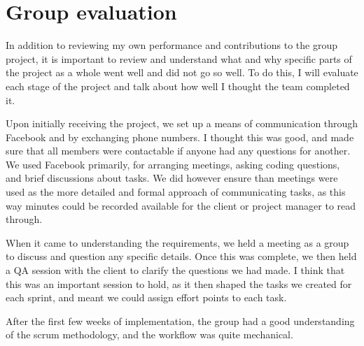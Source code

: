 \section{Group evaluation}
In addition to reviewing my own performance and contributions to the group project, it is important to review and understand what and why specific parts of the project as a whole went well and did not go so well. To do this, I will evaluate each stage of the project and talk about how well I thought the team completed it. \par
Upon initially receiving the project, we set up a means of communication through Facebook and by exchanging phone numbers. I thought this was good, and made sure that all members were contactable if anyone had any questions for another. We used Facebook primarily, for arranging meetings, asking coding questions, and brief discussions about tasks. We did however ensure than meetings were used as the more detailed and formal approach of communicating tasks, as this way minutes could be recorded available for the client or project manager to read through. \par
When it came to understanding the requirements, we held a meeting as a group to discuss and question any specific details. Once this was complete, we then held a QA session with the client to clarify the questions we had made. I think that this was an important session to hold, as it then shaped the tasks we created for each sprint, and meant we could assign effort points to each task. \par
After the first few weeks of implementation, the group had a good understanding of the scrum methodology, and the workflow was quite mechanical. 
